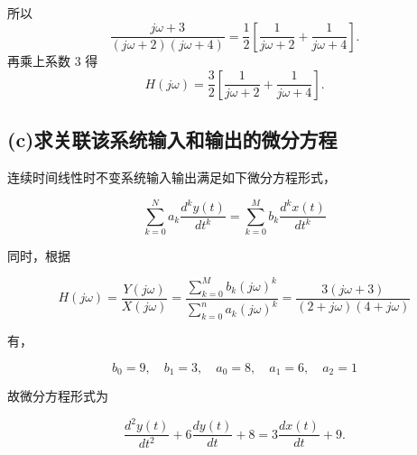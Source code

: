 \documentclass[11pt]{article}
\begin{document}
所以 \[
\frac{j\omega+3}{(j\omega+2)(j\omega+4)}
=\frac{1}{2}\left[\frac{1}{j\omega+2}+\frac{1}{j\omega+4}\right].
\] 再乘上系数 3 得 \[\boxed{
H(j\omega)=\frac{3}{2}\left[\frac{1}{j\omega+2}+\frac{1}{j\omega+4}\right].}
\]

\subsection{(c)求关联该系统输入和输出的微分方程}\label{cux6c42ux5173ux8054ux8be5ux7cfbux7edfux8f93ux5165ux548cux8f93ux51faux7684ux5faeux5206ux65b9ux7a0b}

连续时间线性时不变系统输入输出满足如下微分方程形式，

\[
\sum_{k = 0}^Na_k\frac{d^ky(t)}{dt^k} = \sum_{k = 0}^Mb_k\frac{d^kx(t)}{dt^k}
\]

同时，根据

\[
H(j\omega)=\frac{Y(j\omega)}{X(j\omega)} = \frac{\sum_{k =0}^Mb_k(j\omega)^k}{\sum_{k = 0}^na_k(j\omega)^k} = \frac{3(j\omega+ 3)}{(2+j\omega)(4+j\omega)}
\]

有，

\[
b_0 = 9, \quad b_1 = 3, \quad a_0 = 8, \quad a_1 = 6, \quad a_2 = 1
\]

故微分方程形式为

\[
\boxed{
\frac{d^2y(t)}{dt^2}+6\frac{dy(t)}{dt}+8=3\frac{dx(t)}{dt}+9.}
\]


    
    
    
\end{document}
